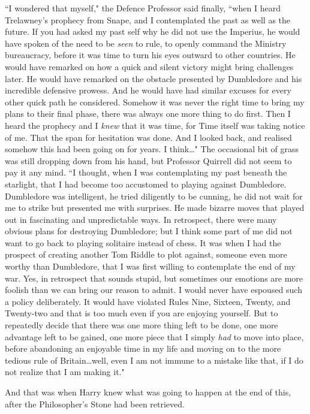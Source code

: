 ``I wondered that myself," the Defence Professor said finally, ``when I heard Trelawney's prophecy from Snape, and I contemplated the past as well as the future. If you had asked my past self why he did not use the Imperius, he would have spoken of the need to be \emph{seen} to rule, to openly command the Ministry bureaucracy, before it was time to turn his eyes outward to other countries. He would have remarked on how a quick and silent victory might bring challenges later. He would have remarked on the obstacle presented by Dumbledore and his incredible defensive prowess. And he would have had similar excuses for every other quick path he considered. Somehow it was never the right time to bring my plans to their final phase, there was always one more thing to do first. Then I heard the prophecy and I \emph{knew} that it was time, for Time itself was taking notice of me. That the span for hesitation was done. And I looked back, and realised somehow this had been going on for years. I think…" The occasional bit of grass was still dropping down from his hand, but Professor Quirrell did not seem to pay it any mind. ``I thought, when I was contemplating my past beneath the starlight, that I had become too accustomed to playing against Dumbledore. Dumbledore was intelligent, he tried diligently to be cunning, he did not wait for me to strike but presented me with surprises. He made bizarre moves that played out in fascinating and unpredictable ways. In retrospect, there were many obvious plans for destroying Dumbledore; but I think some part of me did not want to go back to playing solitaire instead of chess. It was when I had the prospect of creating another Tom Riddle to plot against, someone even more worthy than Dumbledore, that I was first willing to contemplate the end of my war. Yes, in retrospect that sounds stupid, but sometimes our emotions are more foolish than we can bring our reason to admit. I would never have espoused such a policy deliberately. It would have violated Rules Nine, Sixteen, Twenty, and Twenty-two and that is too much even if you are enjoying yourself. But to repeatedly decide that there was one more thing left to be done, one more advantage left to be gained, one more piece that I simply \emph{had} to move into place, before abandoning an enjoyable time in my life and moving on to the more tedious rule of Britain…well, even I am not immune to a mistake like that, if I do not realize that I am making it."

And that was when Harry knew what was going to happen at the end of this, after the Philosopher's Stone had been retrieved.

